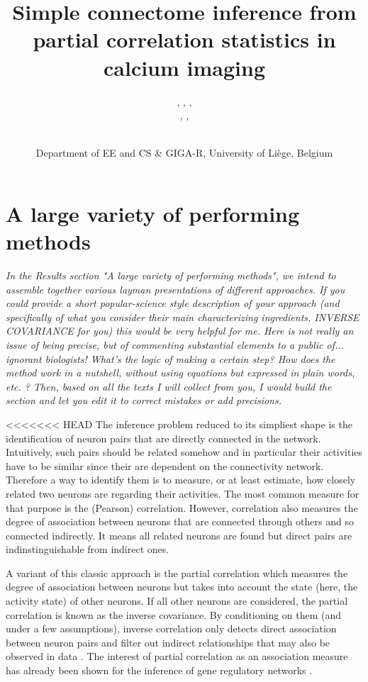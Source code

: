 \documentclass[wcp]{jmlr}
\title{Simple connectome inference from partial correlation statistics in calcium imaging}
\author{\Name{Antonio Sutera},
   \Name{Arnaud Joly},
   \Name{Vincent François-Lavet}, \Email{a.sutera@ulg.ac.be}\\
   \Name{Zixiao Aaron Qiu},
   \Name{Gilles Louppe},
   \Name{Damien Ernst}\and\Name{Pierre Geurts}
    \\
   \addr Department of EE and CS \& GIGA-R, University of Li\`ege, Belgium}
\begin{document}
\section{A large variety of performing methods}

\emph{
In the Results section "A large variety of performing methods", we intend to
assemble together various layman presentations of different approaches. If you
could provide a short popular-science style description of your approach (and
specifically of what you consider their main characterizing ingredients,
INVERSE COVARIANCE for you) this would be very helpful for me.  Here is not
really an issue of being precise, but of commenting substantial elements to a
public of... ignorant biologists! What's the logic of making a certain step?
How does the method work in a nutshell, without using equations but expressed
in plain words, etc. ? Then, based on all the texts I will collect from you, I
would build the section and let you edit it to correct mistakes or add
precisions.\\
}

<<<<<<< HEAD
The inference problem reduced to its simpliest shape is the identification of
neuron pairs that are directly connected in the network. Intuitively, such
pairs should be related somehow and in particular their activities have to be
similar since their are dependent on the connectivity network. Therefore a way
to identify them is to measure, or at least estimate, how closely related two
neurons are regarding their activities. The most common measure for that
purpose is the (Pearson) correlation.  However, correlation also measures the
degree of association between neurons that are connected through others and so 
connected indirectly. It means all related neurons are found but direct pairs
are indinstinguishable from indirect ones.

A variant of this classic approach is the partial correlation which measures
the degree of association between neurons but takes into account the state
(here, the activity state) of other neurons. If all other neurons are
considered, the partial correlation is known as the inverse covariance. By
conditioning on them (and under a few assumptions), inverse correlation only
detects direct association between neuron pairs and filter out indirect
relationships that may also be observed in data \citep{sutera2014simple}. The
interest of partial correlation as an association measure has already been
shown for the inference of gene regulatory networks \citep{de2004discovery,Schafer:2005}.
\end{document}
